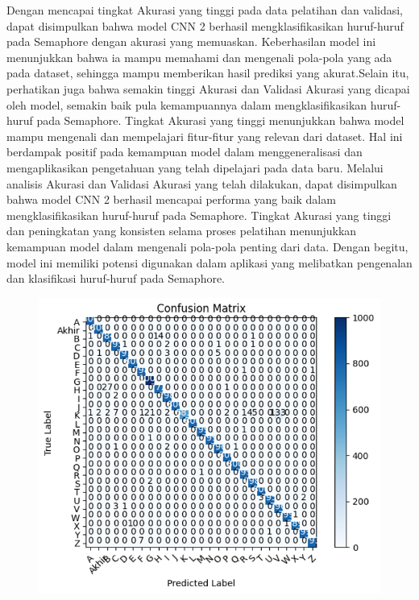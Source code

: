 Dengan mencapai tingkat Akurasi yang tinggi pada data pelatihan dan validasi, dapat disimpulkan bahwa model CNN 2 berhasil mengklasifikasikan huruf-huruf pada Semaphore dengan akurasi yang memuaskan. Keberhasilan model ini menunjukkan bahwa ia mampu memahami dan mengenali pola-pola yang ada pada dataset, sehingga mampu memberikan hasil prediksi yang akurat.Selain itu, perhatikan juga bahwa semakin tinggi Akurasi dan Validasi Akurasi yang dicapai oleh model, semakin baik pula kemampuannya dalam mengklasifikasikan huruf-huruf pada Semaphore. Tingkat Akurasi yang tinggi menunjukkan bahwa model mampu mengenali dan mempelajari fitur-fitur yang relevan dari dataset. Hal ini berdampak positif pada kemampuan model dalam menggeneralisasi dan mengaplikasikan pengetahuan yang telah dipelajari pada data baru. Melalui analisis Akurasi dan Validasi Akurasi yang telah dilakukan, dapat disimpulkan bahwa model CNN 2 berhasil mencapai performa yang baik dalam mengklasifikasikan huruf-huruf pada Semaphore. Tingkat Akurasi yang tinggi dan peningkatan yang konsisten selama proses pelatihan menunjukkan kemampuan model dalam mengenali pola-pola penting dari data. Dengan begitu, model ini memiliki potensi digunakan dalam aplikasi yang melibatkan pengenalan dan klasifikasi huruf-huruf pada Semaphore.

\begin{figure}[!hbt]
	\centering
	\includegraphics[width=0.7\linewidth]{gambar/bener/ConfusionMatrix_ModelCNN2.png}
	\label{fig:TabelModelCNNKedua}
\end{figure}

